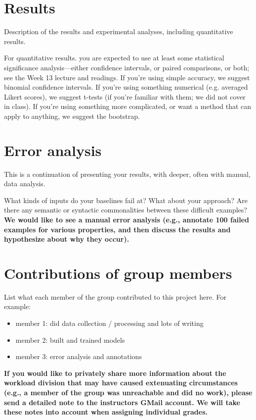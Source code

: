 \documentclass[11pt,a4paper]{article}
\begin{document}
\section{Results}
Description of the results and experimental analyses, including quantitative results.

For quantitative results. you are expected to use at least some statistical significance analysis---either confidence intervals, or paired comparisons, or both; see the Week 13 lecture and readings. If you're using simple accuracy, we suggest binomial confidence intervals.  If you're using something numerical (e.g. averaged Likert scores), we suggest t-tests (if you're familiar with them; we did not cover in class).
If you're using something more complicated, or want a method that can apply to anything, we suggest the bootstrap.

\section{Error analysis}
This is a continuation of presenting your results, with deeper, often with manual, data analysis.

What kinds of inputs do your baselines fail at? What about your approach? Are there any semantic or syntactic commonalities between these difficult examples? \textbf{We would like to see a manual error analysis (e.g., annotate 100 failed examples for various properties, and then discuss the results and hypothesize about why they occur).} 

\section{Contributions of group members}
List what each member of the group contributed to this project here. For example: 
\begin{itemize}
    \item member 1: did data collection / processing and lots of writing
    \item member 2: built and trained models
    \item member 3: error analysis and annotations
\end{itemize}

\textbf{If you would like to privately share more information about the workload division that may have caused extenuating circumstances (e.g., a member of the group was unreachable and did no work), please send a detailed note to the instructors GMail account. We will take these notes into account when assigning individual grades.}
\end{document}

